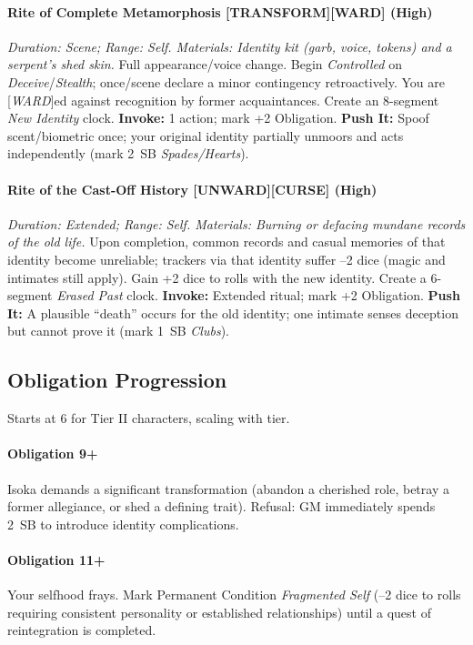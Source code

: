 \paragraph{Rite of Complete Metamorphosis [TRANSFORM][WARD] (High)}%
\emph{Duration: Scene; Range: Self. Materials: Identity kit (garb, voice, tokens) and a serpent's shed skin.}  
Full appearance/voice change. Begin \emph{Controlled} on \emph{Deceive}/\emph{Stealth}; once/scene declare a minor contingency retroactively. You are [\emph{WARD}]ed against recognition by former acquaintances. Create an 8-segment \emph{New Identity} clock.  
\textbf{Invoke:} 1 action; mark +2 Obligation.  
\textbf{Push It:} Spoof scent/biometric once; your original identity partially unmoors and acts independently (mark 2~SB \emph{Spades/Hearts}).

\paragraph{Rite of the Cast-Off History [UNWARD][CURSE] (High)}%
\emph{Duration: Extended; Range: Self. Materials: Burning or defacing mundane records of the old life.}  
Upon completion, common records and casual memories of that identity become unreliable; trackers via that identity suffer --2 dice (magic and intimates still apply). Gain +2 dice to rolls with the new identity. Create a 6-segment \emph{Erased Past} clock.  
\textbf{Invoke:} Extended ritual; mark +2 Obligation.  
\textbf{Push It:} A plausible ``death'' occurs for the old identity; one intimate senses deception but cannot prove it (mark 1~SB \emph{Clubs}).

\subsection*{Obligation Progression}
Starts at 6 for Tier II characters, scaling with tier.

\paragraph{Obligation 9+} Isoka demands a significant transformation (abandon a cherished role, betray a former allegiance, or shed a defining trait). Refusal: GM immediately spends 2~SB to introduce identity complications.  

\paragraph{Obligation 11+} Your selfhood frays. Mark Permanent Condition \emph{Fragmented Self} (--2 dice to rolls requiring consistent personality or established relationships) until a quest of reintegration is completed.


